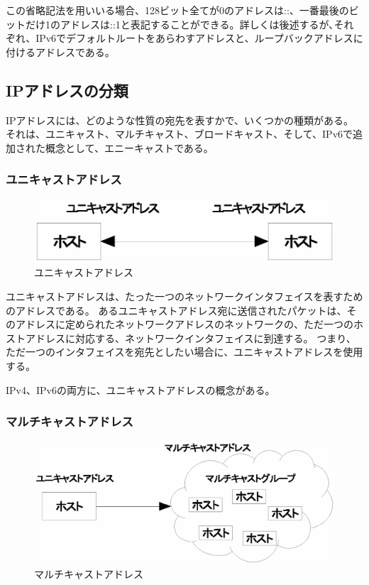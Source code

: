 この省略記法を用いいる場合、128ビット全てが0のアドレスは::、一番最後のビットだけ1のアドレスは::1と表記することができる。詳しくは後述するが､それぞれ、IPv6でデフォルトルートをあらわすアドレスと、ループバックアドレスに付けるアドレスである。

\subsection{IPアドレスの分類}

IPアドレスには、どのような性質の宛先を表すかで、いくつかの種類がある。
それは、ユニキャスト、マルチキャスト、ブロードキャスト、そして、IPv6で追加された概念として、エニーキャストである。

\subsubsection{ユニキャストアドレス}

\begin{figure}[htbp]
	\includegraphics[width=12cm,clip]{draw/unicast.eps}
	\caption{ユニキャストアドレス}
	\label{fig:unicast}
\end{figure}

ユニキャストアドレスは、たった一つのネットワークインタフェイスを表すためのアドレスである。
あるユニキャストアドレス宛に送信されたパケットは、そのアドレスに定められたネットワークアドレスのネットワークの、ただ一つのホストアドレスに対応する、ネットワークインタフェイスに到達する。
つまり、ただ一つのインタフェイスを宛先としたい場合に、ユニキャストアドレスを使用する。

IPv4、IPv6の両方に、ユニキャストアドレスの概念がある。


\subsubsection{マルチキャストアドレス}
\begin{figure}[htbp]
	\includegraphics[width=12cm,clip]{draw/multicast.eps}
	\caption{マルチキャストアドレス}
	\label{fig:multicast}
\end{figure}

